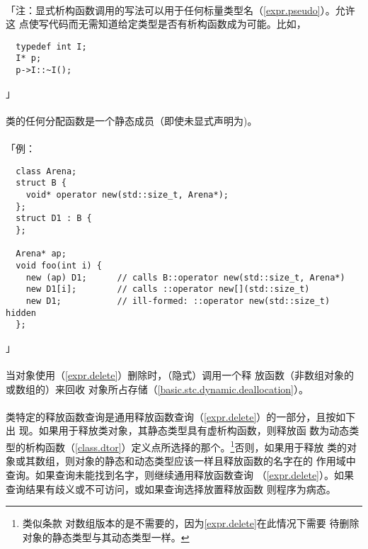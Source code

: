 \paragraph{}
「注：显式析构函数调用的写法可以用于任何标量类型名（\ref{expr.pseudo}）。允许这
点使写代码而无需知道给定类型是否有析构函数成为可能。比如，
\begin{lstlisting}
  typedef int I;
  I* p;
  p->I::~I();
\end{lstlisting}」

\paragraph{}
类的任何分配函数是一个静态成员（即使未显式声明为)。

\paragraph{}
「例：
\begin{lstlisting}
  class Arena;
  struct B {
    void* operator new(std::size_t, Arena*);
  };
  struct D1 : B {
  };

  Arena* ap;
  void foo(int i) {
    new (ap) D1;      // calls B::operator new(std::size_t, Arena*)
    new D1[i];        // calls ::operator new[](std::size_t)
    new D1;           // ill-formed: ::operator new(std::size_t) hidden
  };
\end{lstlisting}」

\paragraph{}
当对象使用（\ref{expr.delete}）删除时，（隐式）调用一个释
放函数（非数组对象的或数组的）来回收
对象所占存储（\ref{basic.stc.dynamic.deallocation}）。

\paragraph{}
类特定的释放函数查询是通用释放函数查询（\ref{expr.delete}）的一部分，且按如下出
现。如果用于释放类对象，其静态类型具有虚析构函数，则释放函
数为动态类型的析构函数（\ref{class.dtor}）定义点所选择的那个。\footnote{类似条款
对数组版本的是不需要的，因为\ref{expr.delete}在此情况下需要
待删除对象的静态类型与其动态类型一样。}否则，如果用于释放
类的对象或其数组，则对象的静态和动态类型应该一样且释放函数的名字在的
作用域中查询。如果查询未能找到名字，则继续通用释放函数查询
（\ref{expr.delete}）。如果查询结果有歧义或不可访问，或如果查询选择放置释放函数
则程序为病态。

